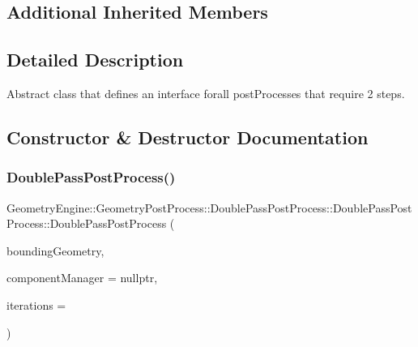 \subsection*{Additional Inherited Members}


\subsection{Detailed Description}
Abstract class that defines an interface forall post\+Processes that require 2 steps. 

\subsection{Constructor \& Destructor Documentation}
\mbox{\label{class_geometry_engine_1_1_geometry_post_process_1_1_double_pass_post_process_1_1_double_pass_post_process_a907023905b18f434bdf0bc2fb918591d}} 
\subsubsection{\texorpdfstring{DoublePassPostProcess()}{DoublePassPostProcess()}\hspace{0.1cm}{\footnotesize\ttfamily [1/2]}}
{\footnotesize\ttfamily Geometry\+Engine\+::\+Geometry\+Post\+Process\+::\+Double\+Pass\+Post\+Process\+::\+Double\+Pass\+Post\+Process\+::\+Double\+Pass\+Post\+Process (\begin{DoxyParamCaption}\item[{const \mbox{\hyperlink{class_geometry_engine_1_1_geometry_world_item_1_1_geometry_item_1_1_geometry_item}{Geometry\+World\+Item\+::\+Geometry\+Item\+::\+Geometry\+Item}} \&}]{bounding\+Geometry,  }\item[{const \mbox{\hyperlink{class_geometry_engine_1_1_custom_shading_1_1_custom_post_process_step_interface}{Custom\+Shading\+::\+Custom\+Post\+Process\+Step\+Interface}} $\ast$const}]{component\+Manager = {\ttfamily nullptr},  }\item[{unsigned int}]{iterations = {} }\end{DoxyParamCaption})\hspace{0.3cm}{\ttfamily [inline]}}

